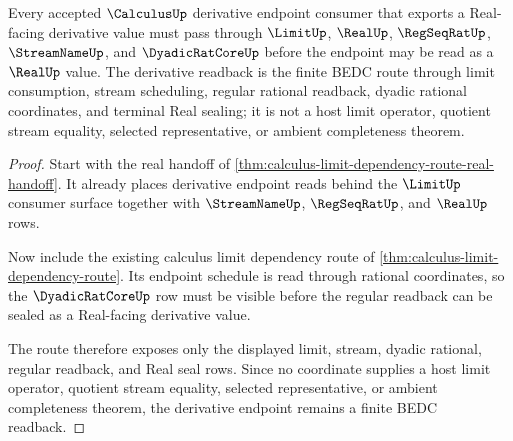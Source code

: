 \begin{theorem}
\label{thm:calculus-limit-real-derivative-readback}
Every accepted $\CalculusUp$ derivative endpoint consumer that exports a Real-facing derivative value must pass through $\LimitUp$, $\RealUp$, $\RegSeqRatUp$, $\StreamNameUp$, and $\DyadicRatCoreUp$ before the endpoint may be read as a $\RealUp$ value. The derivative readback is the finite BEDC route through limit consumption, stream scheduling, regular rational readback, dyadic rational coordinates, and terminal Real sealing; it is not a host limit operator, quotient stream equality, selected representative, or ambient completeness theorem.
\end{theorem}
\begin{proof}
Start with the real handoff of \autoref{thm:calculus-limit-dependency-route-real-handoff}. It already places derivative endpoint reads behind the $\LimitUp$ consumer surface together with $\StreamNameUp$, $\RegSeqRatUp$, and $\RealUp$ rows.

Now include the existing calculus limit dependency route of \autoref{thm:calculus-limit-dependency-route}. Its endpoint schedule is read through rational coordinates, so the $\DyadicRatCoreUp$ row must be visible before the regular readback can be sealed as a Real-facing derivative value.

The route therefore exposes only the displayed limit, stream, dyadic rational, regular readback, and Real seal rows. Since no coordinate supplies a host limit operator, quotient stream equality, selected representative, or ambient completeness theorem, the derivative endpoint remains a finite BEDC readback.
\end{proof}

